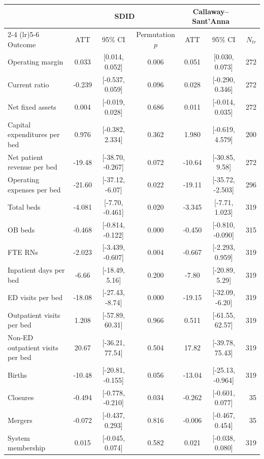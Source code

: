 \begin{tabular}{lcccccr}
\toprule
 & \multicolumn{3}{c}{SDID} & \multicolumn{2}{c}{Callaway--Sant'Anna} & \\
\cmidrule(lr){2-4} \cmidrule(lr){5-6}
Outcome & ATT & 95\% CI & Permutation $p$ & ATT & 95\% CI & $N_{tr}$ \\
\midrule
Operating margin & 0.033 & [0.014, 0.052] & 0.006 & 0.051 & [0.030, 0.073] & 272 \\
Current ratio & -0.239 & [-0.537, 0.059] & 0.096 & 0.028 & [-0.290, 0.346] & 272 \\
Net fixed assets & 0.004 & [-0.019, 0.028] & 0.686 & 0.011 & [-0.014, 0.035] & 272 \\
Capital expenditures per bed & 0.976 & [-0.382, 2.334] & 0.362 & 1.980 & [-0.619, 4.579] & 200 \\
Net patient revenue per bed & -19.48 & [-38.70, -0.267] & 0.072 & -10.64 & [-30.85, 9.58] & 272 \\
Operating expenses per bed & -21.60 & [-37.12, -6.07] & 0.022 & -19.11 & [-35.72, -2.503] & 296 \\
\addlinespace
Total beds & -4.081 & [-7.70, -0.461] & 0.020 & -3.345 & [-7.71, 1.023] & 319 \\
OB beds & -0.468 & [-0.814, -0.122] & 0.000 & -0.450 & [-0.810, -0.090] & 315 \\
FTE RNs & -2.023 & [-3.439, -0.607] & 0.004 & -0.667 & [-2.293, 0.959] & 319 \\
Inpatient days per bed & -6.66 & [-18.49, 5.16] & 0.200 & -7.80 & [-20.89, 5.29] & 319 \\
\addlinespace
ED visits per bed & -18.08 & [-27.43, -8.74] & 0.000 & -19.15 & [-32.09, -6.20] & 319 \\
Outpatient visits per bed & 1.208 & [-57.89, 60.31] & 0.966 & 0.511 & [-61.55, 62.57] & 319 \\
Non-ED outpatient visits per bed & 20.67 & [-36.21, 77.54] & 0.504 & 17.82 & [-39.78, 75.43] & 319 \\
Births & -10.48 & [-20.81, -0.155] & 0.056 & -13.04 & [-25.13, -0.964] & 319 \\
\addlinespace
Closures & -0.494 & [-0.778, -0.210] & 0.034 & -0.262 & [-0.601, 0.077] & 35 \\
Mergers & -0.072 & [-0.437, 0.293] & 0.816 & -0.006 & [-0.467, 0.454] & 35 \\
System membership & 0.015 & [-0.045, 0.074] & 0.582 & 0.021 & [-0.038, 0.080] & 319 \\
\bottomrule
\end{tabular}
